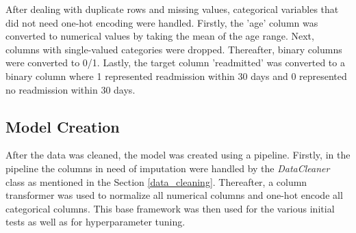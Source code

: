 After dealing with duplicate rows and missing values, categorical variables that did not need one-hot encoding were handled. Firstly, the 'age' column was converted to numerical values 
by taking the mean of the age range. Next, columns with single-valued categories were dropped. Thereafter, binary columns were converted to 0/1. Lastly, the target column 'readmitted' 
was converted to a binary column where 1 represented readmission within 30 days and 0 represented no readmission within 30 days.

\subsection{Model Creation}

After the data was cleaned, the model was created using a pipeline. Firstly, in the pipeline the columns in need of imputation were handled by the \emph{DataCleaner} class as mentioned
in the Section \ref{data_cleaning}. Thereafter, a column transformer was used to normalize all numerical columns and one-hot encode all categorical columns. This base framework was then used 
for the various initial tests as well as for hyperparameter tuning. 

